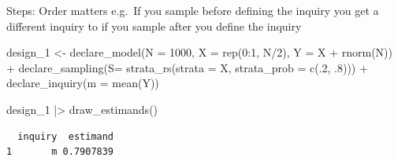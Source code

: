 \documentclass[
  11pt,
  ignorenonframetext,
]{beamer}
\newenvironment{Shaded}{\begin{snugshade}}{\end{snugshade}}
\newcommand{\AttributeTok}[1]{\textcolor[rgb]{0.40,0.45,0.13}{#1}}
\newcommand{\DecValTok}[1]{\textcolor[rgb]{0.68,0.00,0.00}{#1}}
\newcommand{\FunctionTok}[1]{\textcolor[rgb]{0.28,0.35,0.67}{#1}}
\newcommand{\NormalTok}[1]{\textcolor[rgb]{0.00,0.23,0.31}{#1}}
\newcommand{\OtherTok}[1]{\textcolor[rgb]{0.00,0.23,0.31}{#1}}
\newcommand{\SpecialCharTok}[1]{\textcolor[rgb]{0.37,0.37,0.37}{#1}}
\begin{document}
\begin{frame}[fragile]{Steps: Order matters}
\protect\hypertarget{steps-order-matters}{}
e.g.~If you sample before defining the inquiry you get a different
inquiry to if you sample after you define the inquiry

\begin{Shaded}
\begin{Highlighting}[]
\NormalTok{design\_1 }\OtherTok{\textless{}{-}} 
  \FunctionTok{declare\_model}\NormalTok{(}\AttributeTok{N =} \DecValTok{1000}\NormalTok{, }\AttributeTok{X =} \FunctionTok{rep}\NormalTok{(}\DecValTok{0}\SpecialCharTok{:}\DecValTok{1}\NormalTok{, N}\SpecialCharTok{/}\DecValTok{2}\NormalTok{), }\AttributeTok{Y =}\NormalTok{ X }\SpecialCharTok{+} \FunctionTok{rnorm}\NormalTok{(N)) }\SpecialCharTok{+} 
  \FunctionTok{declare\_sampling}\NormalTok{(}\AttributeTok{S=} \FunctionTok{strata\_rs}\NormalTok{(}\AttributeTok{strata =}\NormalTok{ X, }\AttributeTok{strata\_prob =} \FunctionTok{c}\NormalTok{(.}\DecValTok{2}\NormalTok{, .}\DecValTok{8}\NormalTok{))) }\SpecialCharTok{+}
  \FunctionTok{declare\_inquiry}\NormalTok{(}\AttributeTok{m =} \FunctionTok{mean}\NormalTok{(Y))}

\NormalTok{design\_1 }\SpecialCharTok{|\textgreater{}} \FunctionTok{draw\_estimands}\NormalTok{()}
\end{Highlighting}
\end{Shaded}

\begin{verbatim}
  inquiry  estimand
1       m 0.7907839
\end{verbatim}
\end{frame}
\end{document}
